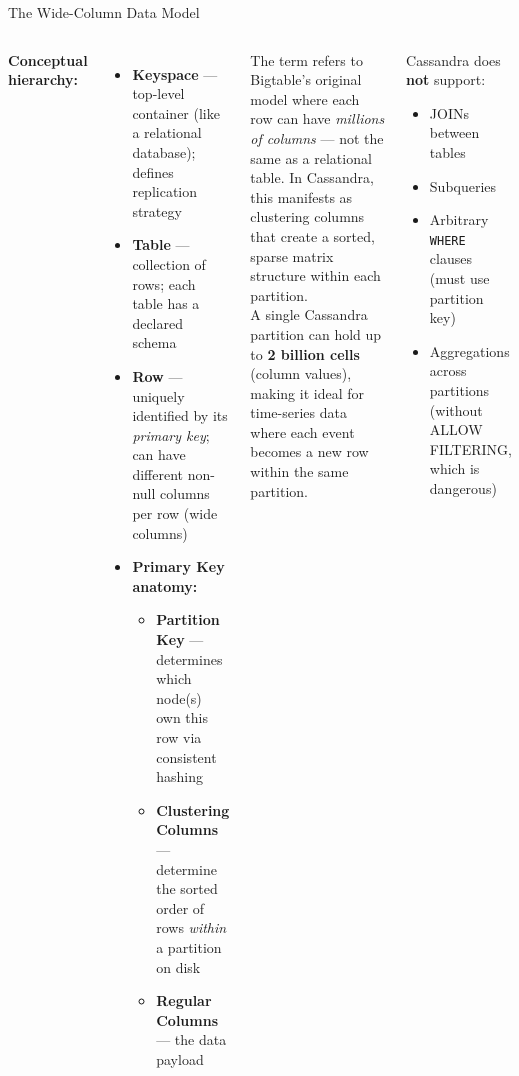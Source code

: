 \documentclass[aspectratio=169]{beamer}
\begin{document}
\begin{frame}{The Wide-Column Data Model}
  \begin{columns}[T]
      \small
      \textbf{Conceptual hierarchy:}
      \begin{itemize}
        \item \textbf{Keyspace} — top-level container (like a relational database); defines replication strategy
        \item \textbf{Table} — collection of rows; each table has a declared schema
        \item \textbf{Row} — uniquely identified by its \textit{primary key}; can have different non-null columns per row (wide columns)
        \item \textbf{Primary Key anatomy:}
          \begin{itemize}\scriptsize
            \item \textbf{Partition Key} — determines which node(s) own this row via consistent hashing
            \item \textbf{Clustering Columns} — determine the sorted order of rows \textit{within} a partition on disk
            \item \textbf{Regular Columns} — the data payload
          \end{itemize}
      \end{itemize}
      \begin{tcolorbox}[deepdivebox, title={Deep Dive: ``Wide Column'' Explained}]
        \scriptsize
        The term refers to Bigtable's original model where each row can have \textit{millions of columns} — not the same as a relational table. In Cassandra, this manifests as clustering columns that create a sorted, sparse matrix structure within each partition.
        \vspace{0.2cm}\\
        A single Cassandra partition can hold up to \textbf{2 billion cells} (column values), making it ideal for time-series data where each event becomes a new row within the same partition.
      \end{tcolorbox}
      \vspace{0.2cm}
      \begin{tcolorbox}[infobox, title=Important Constraint]
        \scriptsize
        Cassandra does \textbf{not} support:
        \begin{itemize}
          \item JOINs between tables
          \item Subqueries
          \item Arbitrary \texttt{WHERE} clauses (must use partition key)
          \item Aggregations across partitions (without ALLOW FILTERING, which is dangerous)
        \end{itemize}
      \end{tcolorbox}
  \end{columns}
\end{frame}
\end{document}
